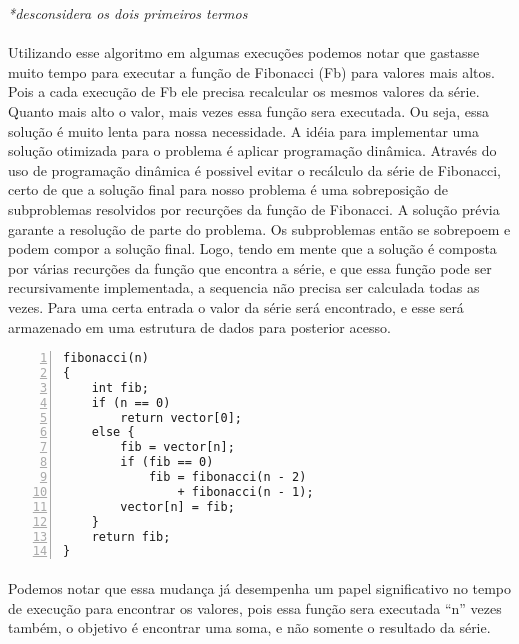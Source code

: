 \documentclass[10pt,a4paper]{article}
\begin{document}
{\raggedleft{}
{
	\it{*desconsidera os dois primeiros termos}
}

{\raggedright{}

	\paragraph{}
	Utilizando esse algoritmo em algumas execuções podemos notar que 
	gastasse muito tempo para executar a função de Fibonacci (Fb) para
	valores mais altos. Pois a cada execução de Fb ele precisa
	recalcular os mesmos valores da série. Quanto mais alto o 
	valor, mais vezes essa função sera executada. 
	Ou seja, essa solução é muito lenta para nossa necessidade.	
	A idéia para implementar uma solução otimizada para o problema 
	é aplicar programação dinâmica. Através do uso de
	programação dinâmica é possivel evitar o recálculo da série
	de Fibonacci, certo de que a solução final para nosso problema é uma
	sobreposição de subproblemas resolvidos por recurções da função de
	Fibonacci. A solução prévia garante a resolução	de parte do problema.
	Os subproblemas então se sobrepoem e podem compor a solução final. 
	Logo, tendo em mente que a solução é composta por várias recurções
	da função que encontra a série, e que essa função pode ser 
	recursivamente implementada, a sequencia não precisa ser calculada 
	todas as vezes. Para uma certa entrada o valor
	da série será encontrado, e esse será armazenado em uma estrutura
	de dados para posterior acesso.

\begin{Verbatim}[frame=single,
				framesep=3mm,
				numbers=left,
				xrightmargin=2cm]
fibonacci(n)
{
	int fib;
	if (n == 0)
		return vector[0];
	else {
		fib = vector[n];
		if (fib == 0)
			fib = fibonacci(n - 2) 
			    + fibonacci(n - 1);
		vector[n] = fib;
	}
	return fib;
}
\end{Verbatim}

	\paragraph{}Podemos notar que essa mudança já desempenha um papel 
	significativo no tempo de execução para encontrar os 
	valores, pois essa função sera executada ``n'' vezes também, 
	o objetivo é encontrar uma soma, e não somente o 
	resultado da série.

}}
\end{document}
